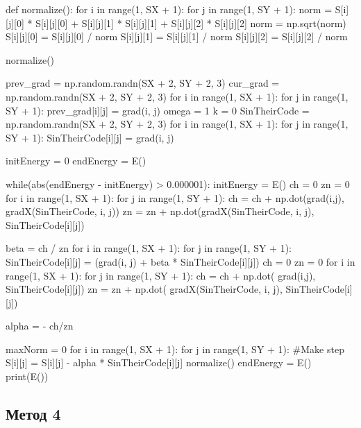 \documentclass[ 12pt,x11names]{article}
\begin{document}
\begin{python}
def normalize():
    for i in range(1, SX + 1):
        for j in range(1, SY + 1):
            norm = S[i][j][0] * S[i][j][0]
                 + S[i][j][1] * S[i][j][1]
                 + S[i][j][2] * S[i][j][2]
            norm = np.sqrt(norm)
            S[i][j][0] = S[i][j][0] / norm
            S[i][j][1] = S[i][j][1] / norm
            S[i][j][2] = S[i][j][2] / norm

normalize()

prev_grad =  np.random.randn(SX + 2, SY + 2, 3)
cur_grad = np.random.randn(SX + 2, SY + 2, 3)
for i in range(1, SX + 1):
    for j in range(1, SY + 1):
        prev_grad[i][j] = grad(i, j)
omega = 1
k = 0
SinTheirCode = np.random.randn(SX + 2, SY + 2, 3)
for i in range(1, SX + 1):
    for j in range(1, SY + 1):
        SinTheirCode[i][j] = grad(i, j)

initEnergy = 0
endEnergy = E()

while(abs(endEnergy - initEnergy) > 0.000001):
    initEnergy = E()
    ch = 0
    zn = 0
    for i in range(1, SX + 1):
        for j in range(1, SY + 1):
            ch = ch + np.dot(grad(i,j), gradX(SinTheirCode, i, j))
            zn = zn + np.dot(gradX(SinTheirCode, i, j),
                             SinTheirCode[i][j])

    beta = ch / zn
    for i in range(1, SX + 1):
        for j in range(1, SY + 1):
            SinTheirCode[i][j] = (grad(i, j)
                                + beta * SinTheirCode[i][j])
    ch = 0
    zn = 0
    for i in range(1, SX + 1):
        for j in range(1, SY + 1):
            ch = ch + np.dot(
                grad(i,j), SinTheirCode[i][j])
            zn = zn + np.dot(
                gradX(SinTheirCode, i, j), SinTheirCode[i][j])

    alpha  = - ch/zn

    maxNorm =  0
    for i in range(1, SX + 1):
        for j in range(1, SY + 1):
            #Make step
            S[i][j] = S[i][j] - alpha * SinTheirCode[i][j]
    normalize()
    endEnergy = E()
print(E())

 \end{python}

\subsection{Метод 4}
\end{document}
